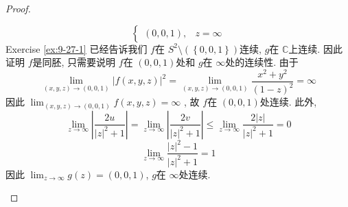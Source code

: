 \documentclass[../main.tex]{subfiles}
\begin{document}
\begin{proof}
\begin{enumerate}
\[\begin{cases}
  \left( 0,0,1 \right),& z = \infty  \end{cases}  
 \] Exercise \ref{ex:9-27-1} 已经告诉我们 \(  f  \)在 \(  S^{2}\setminus \left( \left\{ 0,0,1 \right\} \right)   \)连续,  \(  g  \)在 \(  \mathbb{C}   \)上连续. 因此证明 \(  f  \)是同胚, 只需要说明 \(  f  \)在 \(  \left( 0,0,1 \right)   \)处和 \(  g  \)在 \(  \infty  \)处的连续性.          由于 \[
 \lim_{\left( x,y,z \right)\to \left( 0,0,1 \right)  }\left| f\left( x,y,z \right)  \right|^{2}= \lim_{\left( x,y,z \right)\to \left( 0,0,1 \right)  }\frac{x^{2}+ y^{2}  }{ \left( 1-z \right)^{2} }  = \infty
 \]因此 \(  \lim_{\left( x,y,z \right)\to \left( 0,0,1 \right)  }f\left( x,y,z \right)= \infty   \) , 故 \(  f  \)在 \(  \left( 0,0,1 \right)   \)处连续.  此外,  \[
 \lim_{z\to \infty} \left| \frac{2u  }{\left| z \right|^{2}+ 1  } \right|= \lim_{z\to \infty}\left| \frac{2v }{\left| z \right|^{2}+ 1  }  \right|  \le \lim_{z\to \infty}\frac{ 2\left| z \right| }{\left| z \right|^{2}+ 1  }= 0 
 \] \[
 \lim_{z\to \infty}\frac{\left| z \right|^{2}-1  }{\left| z \right|^{2}+ 1  }=  1 
 \]因此 \(  \lim_{z\to \infty}g\left( z \right)= \left( 0,0,1 \right)    \), \(  g  \)在 \(  \infty  \)处连续. 
 

\end{enumerate}
\end{proof}
\end{document}
